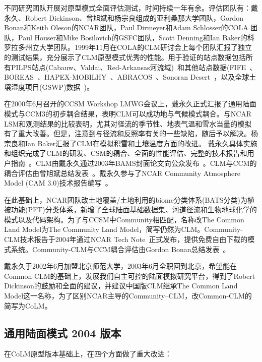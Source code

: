 不同研究团队开展对原型模式全面评估测试，时间持续一年有余。评估团队有：戴永久、Robert Dickinson、曾旭斌和杨宗良组成的亚利桑那大学团队，Gordon Bonan和Keith Oleson的NCAR团队，Paul Dirmeyer和Adam Schlosser的COLA 团队，Paul Houser和Mike Bosilovich的GSFC团队，Scott Denning和Ian Baker的科罗拉多州立大学团队。1999年11月在COLA的CLM研讨会上每个团队汇报了独立的测试结果，充分展示了CLM原型模式优秀的性能。用于验证的站点数据包括所有PILPS站点(Cabauw、Valdai、Red-Arkansas河流域)~\citep{Henderson-Sellers_1993_PILPS}和其他站点数据(FIFE~\citep{Sellers88FIFE}、BOREAS~\citep{Sellers95BOREAS}、HAPEX-MOBILHY~\citep{Andre1986hapex}、ABRACOS~\citep{Gash96ABRACOS}、Sonoran Desert~\citep{Unland1996surface}，以及全球土壤湿度项目(GSWP)数据~\citep{Dirmeyer1999global})。

在2000年6月召开的CCSM Workshop LMWG会议上，戴永久正式汇报了通用陆面模式与CCM3的初步耦合结果，表明CLM可以成功地与气候模式耦合。与NCAR LSM和观测结果的比较表明，尤其对径流的季节性、地表气温和雪水当量的模拟有了重大改善。但是，注意到与径流和反照率有关的一些缺陷，随后予以解决。杨宗良和Ian Baker汇报了CLM在模拟积雪和土壤温度方面的改进。
戴永久具体实施和组织完成了CLM的研发、CSM的耦合、全面的性能评估、完整的技术报告和用户指南~\citep{Dai2001CoLM}。CLM由戴永久通过2003年BAMS封面论文向公众发布~\citep{dai2003common}。CLM与CCM的耦合评估由曾旭斌总结发表~\citep{zeng2002coupling}。戴永久参与了NCAR Community Atmosphere Model (CAM 3.0)技术报告编写~\citep{Collins2004CAM}。

在此基础上，NCAR团队改土地覆盖/土地利用的biome分类体系(BATS分类)为植被功能(PFT)分类体系，新增了全球陆面基础数据集、河道径流和生物地球化学的模式以及代码架构。为了与CCSM中Community相匹配，名称改The Common Land Model为The Community Land Model，简写仍然为CLM。Community-CLM技术报告于2004年通过NCAR Tech Note~\citep{Oleson2004CLM}正式发布，提供免费自由下载的模式系统。Community-CLM与CCM耦合评估由Gordon Bonan总结发表~\citep{Bonan2002CLM}。

戴永久于2002年6月加盟北京师范大学，2003年6月全职回到北京，希望能在Common-CLM的基础上，发展我们自主可控的陆面模拟研究平台，得到了Robert Dickinson的鼓励和全面的建议，并建议中国版CLM继承The Common Land Model这一名称，为了区别NCAR主导的Community–CLM，改Common-CLM的简写为CoLM。


\subsection{通用陆面模式 2004 版本}
在CoLM原型版本基础上，在四个方面做了重大改进：

